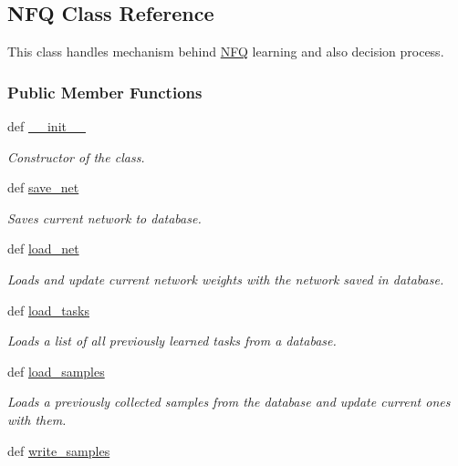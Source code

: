 \hypertarget{class_n_f_q_1_1_n_f_q}{\subsection{N\+F\+Q Class Reference}
\label{class_n_f_q_1_1_n_f_q}
}


This class handles mechanism behind \hyperlink{class_n_f_q_1_1_n_f_q}{N\+F\+Q} learning and also decision process.  


\subsubsection*{Public Member Functions}
\begin{DoxyCompactItemize}
\item 
def \hyperlink{class_n_f_q_1_1_n_f_q_ac775ee34451fdfa742b318538164070e}{\+\_\+\+\_\+init\+\_\+\+\_\+}
\begin{DoxyCompactList}\small\item\em Constructor of the class. \end{DoxyCompactList}\item 
def \hyperlink{class_n_f_q_1_1_n_f_q_a6b708400f5bc84a9084858995ec0e1e3}{save\+\_\+net}
\begin{DoxyCompactList}\small\item\em Saves current network to database. \end{DoxyCompactList}\item 
def \hyperlink{class_n_f_q_1_1_n_f_q_ace29d26dedd78bf2aa11a7a6a4963ba1}{load\+\_\+net}
\begin{DoxyCompactList}\small\item\em Loads and update current network weights with the network saved in database. \end{DoxyCompactList}\item 
def \hyperlink{class_n_f_q_1_1_n_f_q_af8c46da13010e428234320546345b43b}{load\+\_\+tasks}
\begin{DoxyCompactList}\small\item\em Loads a list of all previously learned tasks from a database. \end{DoxyCompactList}\item 
\hypertarget{class_n_f_q_1_1_n_f_q_a825de7cd4b9446c695dc6f7d53a486e9}{def \hyperlink{class_n_f_q_1_1_n_f_q_a825de7cd4b9446c695dc6f7d53a486e9}{load\+\_\+samples}}\label{class_n_f_q_1_1_n_f_q_a825de7cd4b9446c695dc6f7d53a486e9}

\begin{DoxyCompactList}\small\item\em Loads a previously collected samples from the database and update current ones with them. \end{DoxyCompactList}\item 
\hypertarget{class_n_f_q_1_1_n_f_q_a049ce9e8a989730486b24d334489a6b6}{def \hyperlink{class_n_f_q_1_1_n_f_q_a049ce9e8a989730486b24d334489a6b6}{write\+\_\+samples}}\label{class_n_f_q_1_1_n_f_q_a049ce9e8a989730486b24d334489a6b6}


\end{DoxyCompactItemize}
